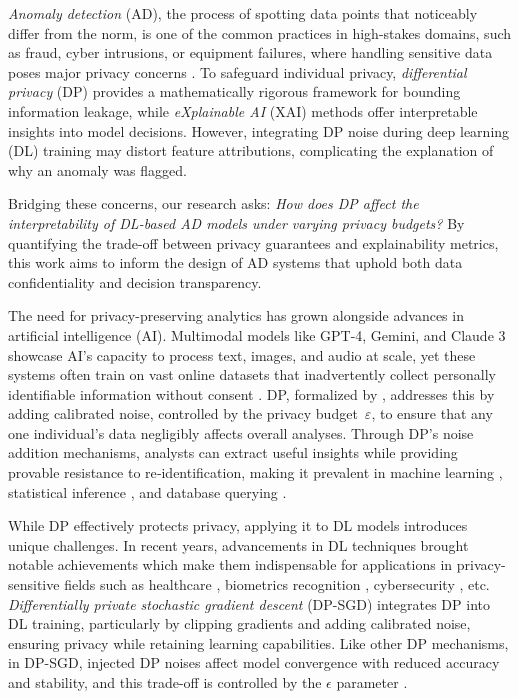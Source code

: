 \textit{Anomaly detection} (AD), the process of spotting data points that noticeably differ from the norm, is one of the common practices in high-stakes domains, such as fraud, cyber intrusions, or equipment failures, where handling sensitive data poses major privacy concerns \citep{fan2013differentially}. To safeguard individual privacy, \textit{differential privacy} (DP) provides a mathematically rigorous framework for bounding information leakage, while \textit{eXplainable AI} (XAI) methods offer interpretable insights into model decisions. However, integrating DP noise during deep learning (DL) training may distort feature attributions, complicating the explanation of why an anomaly was flagged.

Bridging these concerns, our research asks: \emph{How does DP affect the interpretability of DL-based AD models under varying privacy budgets?} By quantifying the trade-off between privacy guarantees and explainability metrics, this work aims to inform the design of AD systems that uphold both data confidentiality and decision transparency.

The need for privacy-preserving analytics has grown alongside advances in artificial intelligence (AI). Multimodal models like GPT-4, Gemini, and Claude 3 showcase AI’s capacity to process text, images, and audio at scale, yet these systems often train on vast online datasets that inadvertently collect personally identifiable information without consent \citep{perrault2024artificial}. DP, formalized by \citet{dwork2006calibrating}, addresses this by adding calibrated noise, controlled by the privacy budget~$\varepsilon$, to ensure that any one individual’s data negligibly affects overall analyses. Through DP’s noise addition mechanisms, analysts can extract useful insights while providing provable resistance to re‑identification, making it prevalent in machine learning \citep{abadi2016deep,papernot2016semi}, statistical inference \citep{wasserman2010statistical,steinberger2024efficiency}, and database querying \citep{mcsherry2009privacy}.

While DP effectively protects privacy, applying it to DL models introduces unique challenges. In recent years, advancements in DL techniques brought notable achievements which make them indispensable for applications in privacy-sensitive fields such as healthcare \citep{shamshirband2021review}, biometrics recognition \citep{minaee2023biometrics}, cybersecurity \citep{dixit2021deep}, etc. \textit{Differentially private stochastic gradient descent} (DP-SGD) integrates DP into DL training, particularly by clipping gradients and adding calibrated noise, ensuring privacy while retaining learning capabilities. Like other DP mechanisms, in DP-SGD, injected DP noises affect model convergence with reduced accuracy and stability, and this trade-off is controlled by the $\epsilon$ parameter \citep{abadi2016deep}.

